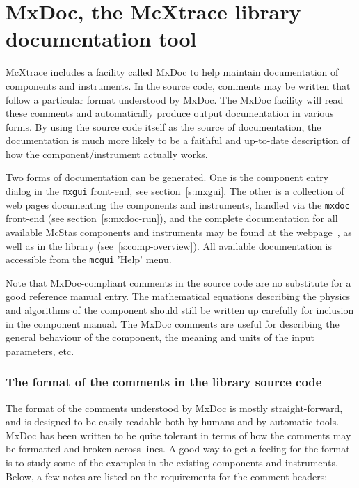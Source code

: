 \section{MxDoc, the McXtrace library documentation tool}
\label{s:mxdoc}

McXtrace includes a facility called MxDoc to help maintain documentation of
components and instruments. In the source code, comments may be
written that follow a particular format understood by MxDoc. The MxDoc facility
will read these comments and automatically produce output documentation in
various forms. By using the source code itself as the source of documentation,
the documentation is much more likely to be a faithful and up-to-date
description of how the component/instrument actually works.

Two forms of documentation can be generated. One
is the component entry dialog in the \verb+mxgui+ front-end, see
section~\ref{s:mxgui}. The other is a collection of web pages documenting
the components and instruments, handled via the \verb+mxdoc+ front-end (see section~\ref{s:mxdoc-run}), and the complete documentation for all available
McStas components and instruments may be found at the \MCX
webpage~\cite{mcxtrace_webpage}, as well as in the \MCX library
(see~\ref{s:comp-overview}). All available \MCX documentation is accessible from the \verb+mcgui+ 'Help' menu.

Note that MxDoc-compliant comments in the source code are no substitute
for a good reference manual entry. The mathematical equations describing
the physics and algorithms of the component should still be written up
carefully for inclusion in the component manual. The MxDoc comments are
useful for describing the general behaviour of the component, the
meaning and units of the input parameters, etc.


\subsubsection{The format of the comments in the library source code}

The format of the comments understood by MxDoc is mostly
straight-forward, and is designed to be easily readable both by humans
and by automatic tools. MxDoc has been written to be quite tolerant in
terms of how the comments may be formatted and broken across lines. A
good way to get a feeling for the format is to study some of the examples
in the existing components and instruments. Below, a few
notes are listed on the requirements for the comment headers:

